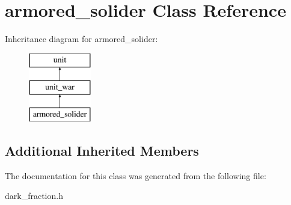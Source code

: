 \hypertarget{classarmored__solider}{}\section{armored\+\_\+solider Class Reference}
\label{classarmored__solider}
Inheritance diagram for armored\+\_\+solider\+:\begin{figure}[H]
\begin{center}
\leavevmode
\includegraphics[height=3.000000cm]{classarmored__solider}
\end{center}
\end{figure}
\subsection*{Additional Inherited Members}


The documentation for this class was generated from the following file\+:\begin{DoxyCompactItemize}
\item 
dark\+\_\+fraction.\+h\end{DoxyCompactItemize}
